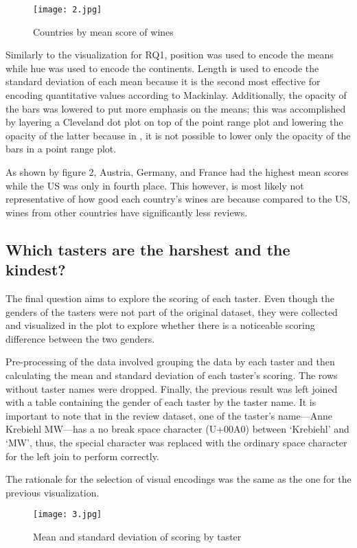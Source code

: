 \begin{figure}[h]
  \texttt{[image: 2.jpg]} 
  \caption{Countries by mean score of wines}
\end{figure}

Similarly to the visualization for RQ1, position was used to encode the means while hue was used to encode the continents. Length is used to encode the standard deviation of each mean because it is the second most effective for encoding quantitative values according to Mackinlay. Additionally, the opacity of the bars was lowered to put more emphasis on the means; this was accomplished by layering a Cleveland dot plot on top of the point range plot and lowering the opacity of the latter because in , it is not possible to lower only the opacity of the bars in a point range plot.

As shown by figure 2, Austria, Germany, and France had the highest mean scores while the US was only in fourth place. This however, is most likely not representative of how good each country's wines are because compared to the US, wines from other countries have significantly less reviews.

\subsection{Which tasters are the harshest and the kindest?}
The final question aims to explore the scoring of each taster. Even though the genders of the tasters were not part of the original dataset, they were collected and visualized in the plot to explore whether there is a noticeable scoring difference between the two genders.

Pre-processing of the data involved grouping the data by each taster and then calculating the mean and standard deviation of each taster's scoring. The rows without taster names were dropped. Finally, the previous result was left joined with a table containing the gender of each taster by the taster name. It is important to note that in the review dataset, one of the taster's name---Anne Krebiehl MW---has a no break space character (U+00A0) between `Krebiehl' and `MW', thus, the special character was replaced with the ordinary space character for the left join to perform correctly.

The rationale for the selection of visual encodings was the same as the one for the previous visualization.

\begin{figure}[h]
  \texttt{[image: 3.jpg]} 
  \caption{Mean and standard deviation of scoring by taster} %
\end{figure}

